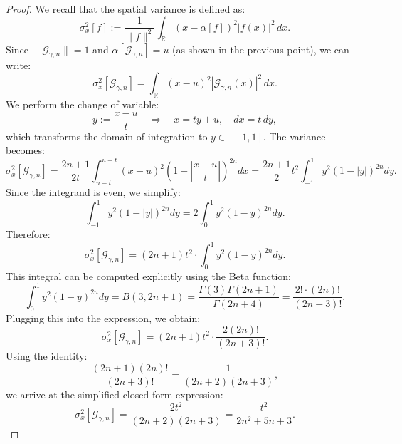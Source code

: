 \documentclass[preprint,hidelinks,authoryear]{elsarticle}
\theoremstyle{plain}
\theoremstyle{definition}
\theoremstyle{remark}
\begin{document}
\begin{proof}
We recall that the spatial variance is defined as:
$$
\sigma_x^2[f] := \frac{1}{\|f\|^2} \int_{\mathbb{R}} (x - \alpha[f])^2 |f(x)|^2 \, dx.
$$
Since $ \| \mathcal{G}_{\gamma,n} \| = 1 $ and $ \alpha[\mathcal{G}_{\gamma,n}] = u $ (as shown in the previous point), we can write:
$$
\sigma_x^2[\mathcal{G}_{\gamma,n}] = \int_{\mathbb{R}} (x - u)^2 |\mathcal{G}_{\gamma,n}(x)|^2 \, dx.
$$
We perform the change of variable:
$$
y := \frac{x - u}{t} \quad \Rightarrow \quad x = t y + u, \quad dx = t \, dy,
$$
which transforms the domain of integration to $ y \in [-1, 1] $. The variance becomes:
$$
\sigma_x^2[\mathcal{G}_{\gamma,n}] = \frac{2n+1}{2t} \int_{u - t}^{u + t} (x - u)^2 \left(1 - \left| \frac{x - u}{t} \right| \right)^{2n} dx
= \frac{2n+1}{2} t^2 \int_{-1}^{1} y^2 (1 - |y|)^{2n} dy.
$$
Since the integrand is even, we simplify:
$$
\int_{-1}^{1} y^2 (1 - |y|)^{2n} dy = 2 \int_0^1 y^2 (1 - y)^{2n} dy.
$$
Therefore:
$$
\sigma_x^2[\mathcal{G}_{\gamma,n}] = (2n+1)t^2 \cdot \int_0^1 y^2 (1 - y)^{2n} dy.
$$
This integral can be computed explicitly using the Beta function:
$$
\int_0^1 y^2 (1 - y)^{2n} dy = B(3, 2n + 1) = \frac{\Gamma(3)\Gamma(2n + 1)}{\Gamma(2n + 4)} = \frac{2! \cdot (2n)!}{(2n + 3)!}.
$$
Plugging this into the expression, we obtain:
$$
\sigma_x^2[\mathcal{G}_{\gamma,n}] = (2n+1)t^2 \cdot \frac{2(2n)!}{(2n+3)!}.
$$
Using the identity:
$$
\frac{(2n+1)(2n)!}{(2n+3)!} = \frac{1}{(2n+2)(2n+3)},
$$
we arrive at the simplified closed-form expression:
$$
\sigma_x^2[\mathcal{G}_{\gamma,n}] = \frac{2 t^2}{(2n + 2)(2n + 3)}=\frac{t^2}{2n^2+5n+3}.
$$



\end{proof}
\end{document}
